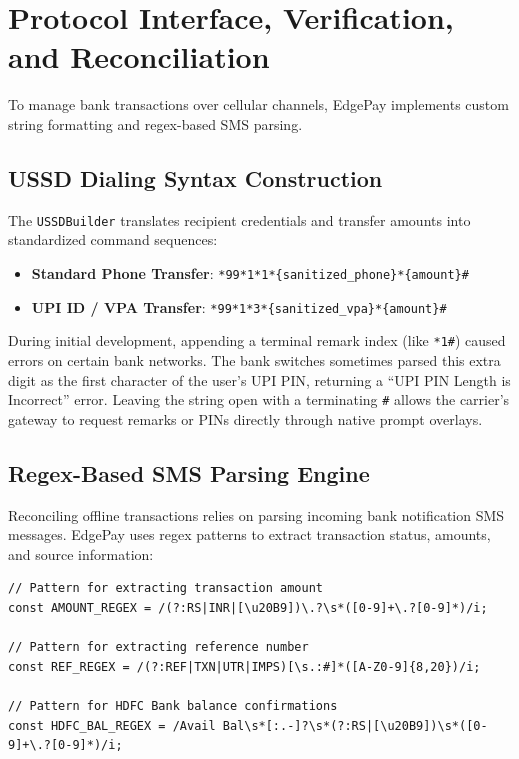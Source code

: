 \documentclass[10pt,journal,compsoc]{IEEEtran}
\begin{document}
\section{Protocol Interface, Verification, and Reconciliation}
To manage bank transactions over cellular channels, EdgePay implements custom string formatting and regex-based SMS parsing.

\subsection{USSD Dialing Syntax Construction}
The \texttt{USSDBuilder} translates recipient credentials and transfer amounts into standardized command sequences:
\begin{itemize}
    \item \textbf{Standard Phone Transfer}: \texttt{*99*1*1*\{sanitized\_phone\}*\{amount\}\#}
    \item \textbf{UPI ID / VPA Transfer}: \texttt{*99*1*3*\{sanitized\_vpa\}*\{amount\}\#}
\end{itemize}

During initial development, appending a terminal remark index (like \texttt{*1\#}) caused errors on certain bank networks. The bank switches sometimes parsed this extra digit as the first character of the user's UPI PIN, returning a ``UPI PIN Length is Incorrect'' error. Leaving the string open with a terminating \texttt{\#} allows the carrier's gateway to request remarks or PINs directly through native prompt overlays.

\subsection{Regex-Based SMS Parsing Engine}
Reconciling offline transactions relies on parsing incoming bank notification SMS messages. EdgePay uses regex patterns to extract transaction status, amounts, and source information:

\begin{lstlisting}[caption={Core regular expressions for extracting values from bank notifications.}]
// Pattern for extracting transaction amount
const AMOUNT_REGEX = /(?:RS|INR|[\u20B9])\.?\s*([0-9]+\.?[0-9]*)/i;

// Pattern for extracting reference number
const REF_REGEX = /(?:REF|TXN|UTR|IMPS)[\s.:#]*([A-Z0-9]{8,20})/i;

// Pattern for HDFC Bank balance confirmations
const HDFC_BAL_REGEX = /Avail Bal\s*[:.-]?\s*(?:RS|[\u20B9])\s*([0-9]+\.?[0-9]*)/i;
\end{lstlisting}
\end{document}
